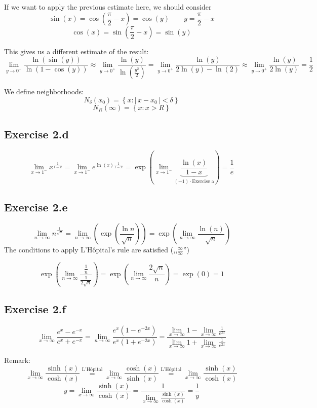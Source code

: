 \documentclass[a4paper]{article}
\theoremstyle{definition}
\newcommand\abs[1]{\left|\,#1\,\right|}
\newcommand\set[1]{\left\{#1\right\}}
\begin{document}
If we want to apply the previous estimate here, we should consider
\[ \sin(x) = \cos\left(\frac\pi2 - x\right) = \cos(y) \qquad y = \frac\pi2 - x \]
\[ \cos(x) = \sin\left(\frac\pi2 - x\right) = \sin(y) \]

This gives us a different estimate of the result:
\[
  \lim_{y\to0^+} \frac{\ln(\sin(y))}{\ln(1 - \cos(y))}
  \approx \lim_{y\to0^+} \frac{\ln(y)}{\ln\left(\frac{y^2}{2}\right)}
  = \lim_{y\to0^+} \frac{\ln(y)}{2\ln(y) - \ln(2)}
  \approx \lim_{y\to0^+} \frac{\ln(y)}{2\ln(y)}
  = \frac12
\]


We define neighborhoods:
\[ N_\delta(x_0) = \set{x: \abs{x - x_0} < \delta} \]
\[ N_R(\infty) = \set{x: x > R} \]

\subsection{Exercise 2.d}
%
\[
  \lim_{x\to1^-} x^{\frac{1}{1 - x}} = \lim_{x\to1^-} e^{\ln(x) \frac{1}{1 - x}}
  = \exp\left(\lim_{x\to1^-} \underbrace{\frac{\ln(x)}{1 - x}}_{(-1) \cdot \text{Exercise a}}\right)
  = \frac1e
\]

\subsection{Exercise 2.e}
%
\[
  \lim_{n\to\infty} n^{\frac1{\sqrt{n}}} = \lim_{n\to\infty} \left(\exp\left(\frac{\ln{n}}{\sqrt{n}}\right)\right)
    = \exp\left(\lim_{n\to\infty} \frac{\ln(n)}{\sqrt{n}}\right)
\]
The conditions to apply L'H\^opital's rule are satisfied (,,$\frac{\infty}{\infty}$'')

\[
  \exp\left(\lim_{n\to\infty} \frac{\frac{1}{n}}{\frac{1}{2\sqrt{n}}}\right)
    = \exp\left(\lim_{n\to\infty} \frac{2\sqrt{n}}{n}\right)
    = \exp(0) = 1
\]

\subsection{Exercise 2.f}
%
\[
  \lim_{x\to\infty} \frac{e^x - e^{-x}}{e^x + e^{-x}}
    = \lim_{n\to\infty} \frac{e^x \left(1 - e^{-2x}\right)}{e^x \left(1 + e^{-2x}\right)}
    = \frac{\lim_{x\to\infty} 1 - \lim_{x\to\infty} \frac{1}{e^{2x}}}{\lim_{x\to\infty} 1 + \lim_{x\to\infty} \frac{1}{e^{2x}}}
\]

Remark:
\[
  \lim_{x\to\infty} \frac{\sinh(x)}{\cosh(x)}
    \overset{\text{L'H\^opital}}= \lim_{x\to\infty} \frac{\cosh(x)}{\sinh(x)}
    \overset{\text{L'H\^opital}}= \lim_{x\to\infty} \frac{\sinh(x)}{\cosh(x)}
\] \[
  y = \lim_{x\to\infty} \frac{\sinh(x)}{\cosh(x)} = \frac{1}{\lim_{x\to\infty} \frac{\sinh(x)}{\cosh(x)}}
    = \frac1y
\]
\end{document}

